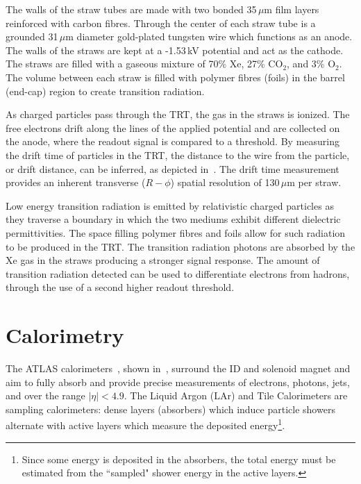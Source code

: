 The walls of the straw tubes are made with two bonded 35\,$\mu$m film layers
reinforced with carbon fibres. Through the center of each straw tube is a grounded 31\,$\mu$m diameter gold-plated
tungsten wire which functions as an anode. The walls of the straws are kept at a -1.53\,kV potential and act as the cathode. The straws are filled with a gaseous mixture of 70\% Xe, 27\% CO$_2$, and 3\% O$_2$.
The volume between each straw is filled with polymer fibres (foils) in the barrel (end-cap) region to create transition radiation.

As charged particles pass through the TRT, the gas in the straws is ionized. The free electrons drift along the lines of the applied potential and are collected on the anode, where the readout signal is compared to a threshold.  By measuring the drift time of particles in the TRT, the distance to the wire from the particle, or drift distance, can be inferred, as depicted in~\Fig{\ref{fig:trt_drift}}. The drift time measurement provides an inherent transverse ($R-\phi$) spatial resolution of 130\,$\mu$m per straw.

Low energy transition radiation is emitted by relativistic charged particles as they traverse a boundary in which the two mediums exhibit different dielectric permittivities. The space filling polymer fibres and foils allow for such radiation to be produced in the TRT. The transition radiation photons are absorbed by the Xe gas in the straws producing a stronger signal response. The amount of transition radiation detected can be used to differentiate
electrons from hadrons, through the use of a second higher readout threshold. 


\section{Calorimetry}

The ATLAS calorimeters~\cite{LAr_TDR,Tile_TDR}, shown in~\Fig{\ref{fig:cal_layout}}, surround the ID and solenoid magnet and aim to fully absorb and provide precise measurements of electrons, photons, jets, and \MET over the range $|\eta|<4.9$. The Liquid Argon (LAr) and Tile Calorimeters are sampling calorimeters: dense layers (absorbers) which induce particle showers alternate with active layers which measure the deposited energy\footnote{
	Since some energy is deposited in the absorbers, the total energy must be estimated from the ``sampled" shower energy in the active layers.
}.

